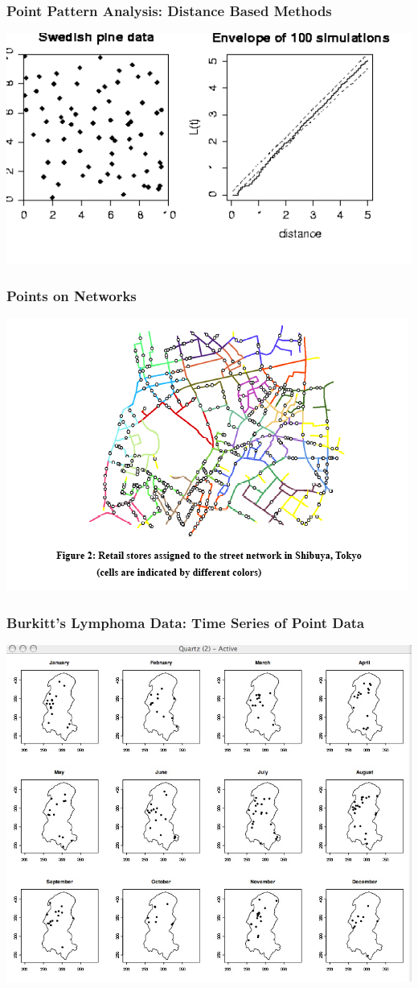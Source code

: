 \documentclass[nototal,handout]{beamer}
\begin{document}
     \begin{frame}
       \frametitle{Point Pattern Analysis: Distance Based Methods}
       \begin{center}
	 \includegraphics[width=.65\linewidth]{pinepoint.pdf}
       \end{center}
     \end{frame}

     \begin{frame}
       \frametitle{Points on Networks}
       \begin{center}
	 \includegraphics[width=.65\linewidth]{sanet.jpg}
       \end{center}
     \end{frame}

     \begin{frame}
       \frametitle{Burkitt's Lymphoma Data: Time Series of Point Data}
       \begin{center}
	 \includegraphics[width=.65\linewidth]{tspoints.jpg}
       \end{center}
     \end{frame}
\end{document}
